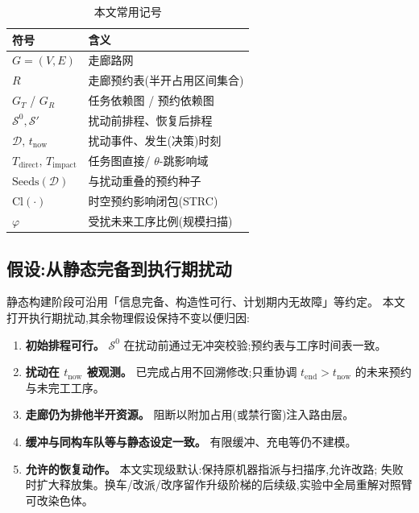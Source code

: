 \documentclass[manuscript,screen,review]{acmart}
\providecommand{\STRC}{\textsc{STRC}}
\begin{document}
\begin{table}[t]
\centering
\caption{本文常用记号}
\label{tab:notation}
\small
\begin{tabular}{@{}ll@{}}
\toprule
\textbf{符号} & \textbf{含义} \\
\midrule
\(G=(V,E)\) & 走廊路网 \\
\(R\) & 走廊预约表(半开占用区间集合) \\
\(G_T\) / \(G_R\) & 任务依赖图 / 预约依赖图 \\
\(\mathcal{S}^0,\mathcal{S}'\) & 扰动前排程、恢复后排程 \\
\(\mathcal{D},\,t_{\mathrm{now}}\) & 扰动事件、发生(决策)时刻 \\
\(T_{\mathrm{direct}},\,T_{\mathrm{impact}}\) & 任务图直接/ \(\theta\)-跳影响域 \\
\(\mathrm{Seeds}(\mathcal{D})\) & 与扰动重叠的预约种子 \\
\(\mathrm{Cl}(\cdot)\) & 时空预约影响闭包(\STRC) \\
\(\varphi\) & 受扰未来工序比例(规模扫描) \\
\bottomrule
\end{tabular}
\end{table}

\subsection{假设:从静态完备到执行期扰动}
\label{sec:assumptions}

静态构建阶段可沿用「信息完备、构造性可行、计划期内无故障」等约定。
本文打开执行期扰动,其余物理假设保持不变以便归因:

\begin{enumerate}[label=\textbf{A\arabic*.},leftmargin=*,topsep=2pt,itemsep=2pt]
\item \textbf{初始排程可行。} \(\mathcal{S}^0\) 在扰动前通过无冲突校验;预约表与工序时间表一致。
\item \textbf{扰动在 \(t_{\mathrm{now}}\) 被观测。} 已完成占用不回溯修改;只重协调
\(t_{\mathrm{end}}>t_{\mathrm{now}}\) 的未来预约与未完工工序。
\item \textbf{走廊仍为排他半开资源。} 阻断以附加占用(或禁行窗)注入路由层。
\item \textbf{缓冲与同构车队等与静态设定一致。} 有限缓冲、充电等仍不建模。
\item \textbf{允许的恢复动作。} 本文实现级默认:保持原机器指派与扫描序,允许改路;
失败时扩大释放集。换车/改派/改序留作升级阶梯的后续级,实验中全局重解对照臂可改染色体。
\end{enumerate}
\end{document}
